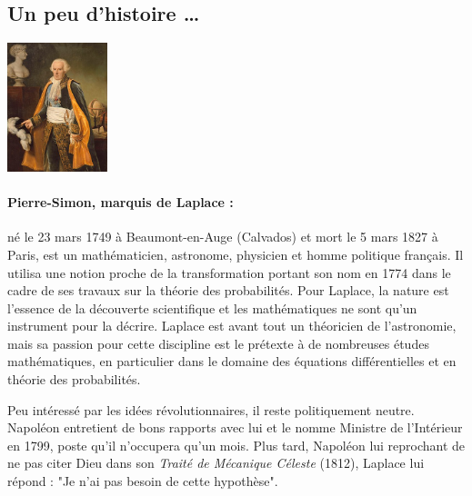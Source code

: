 \newpage 
\subsection*{Un peu d'histoire \dots}

\begin{minipage}{0.2\linewidth}
\begin{center}\includegraphics[width=2.9cm]{images/Laplace.jpeg}\end{center}
\end{minipage}
\begin{minipage}{0.8 \linewidth}
\small{\paragraph*{Pierre-Simon, marquis de Laplace :} né le 23 mars 1749 à Beaumont-en-Auge (Calvados) et mort le 5 mars 1827 à Paris, est un mathématicien, astronome, physicien et homme politique français. Il utilisa une notion proche de la transformation portant son nom en 1774 dans le cadre de ses travaux sur la théorie des probabilités. Pour Laplace, la nature est l'essence de la découverte scientifique et les mathématiques ne sont qu'un instrument pour la décrire. Laplace est avant tout un théoricien de l'astronomie, mais sa passion pour cette discipline est le prétexte à de nombreuses études mathématiques, en particulier dans le domaine des équations différentielles et en théorie des probabilités. 

Peu intéressé par les idées révolutionnaires, il reste politiquement neutre. Napoléon entretient de bons rapports avec lui et le nomme Ministre de l'Intérieur en 1799, poste qu'il n'occupera qu'un mois. Plus tard, Napoléon lui reprochant de ne pas citer Dieu dans son \textit{Traité de Mécanique Céleste} (1812), Laplace lui répond : "Je n'ai pas besoin de cette hypothèse".  
}
\end{minipage}

\vfill